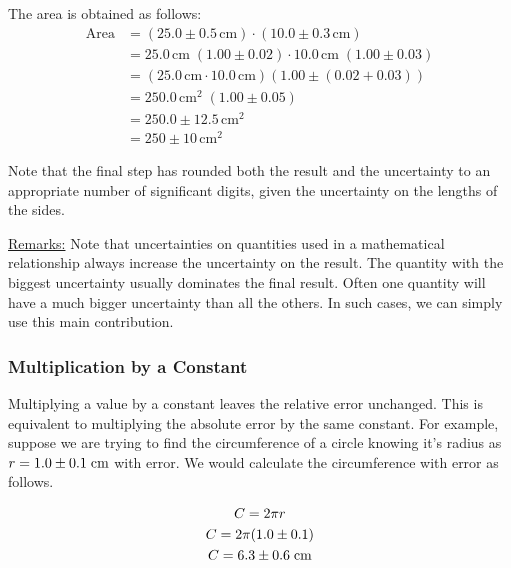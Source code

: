 The area is obtained as follows:
\begin{equation}
    \begin{split}
        \text{Area} &= \left( 25.0\pm 0.5\,\mathrm{cm} \right)\cdot\left( 10.0\pm 0.3\,\mathrm{cm} \right) \\
        &= 25.0\,\mathrm{cm}\;\left( 1.00\pm 0.02 \right)\cdot 10.0\,\mathrm{cm}\;\left( 1.00\pm 0.03 \right) \\
        &= \left( 25.0\,\mathrm{cm}\cdot 10.0\,\mathrm{cm} \right)\left( 1.00\pm \left( 0.02 + 0.03 \right) \right) \\
        &= 250.0\,\mathrm{cm}^2\;(1.00 \pm 0.05) \\
        &= 250.0\pm 12.5\,\mathrm{cm}^2 \\
        &= 250 \pm 10\,\mathrm{cm}^2
    \end{split}
\end{equation}

Note that the final step has rounded both the result and the uncertainty to an appropriate number of significant digits, given the uncertainty on the lengths of the sides. \myskip

\underline{Remarks:} Note that uncertainties on quantities used in a mathematical relationship always increase the uncertainty on the result. The quantity with the biggest uncertainty usually dominates the final result. Often one quantity will have a much bigger uncertainty than all the others. In such cases, we can simply use this main contribution.

\subsubsection{Multiplication by a Constant}

Multiplying a value by a constant leaves the relative error unchanged. This is equivalent to multiplying the absolute error by the same constant. For example, suppose we are trying to find the circumference of a circle knowing it's radius as $r=1.0 \pm 0.1 \hspace{1mm} \text{cm}$ with error. We would calculate the circumference with error as follows.

\begin{gather}
C = 2\pi r \nonumber \\
 C= 2\pi (1.0 \pm 0.1) \\
 C=6.3 \pm 0.6 \hspace{1mm}  \text{cm} \nonumber
\end{gather}

